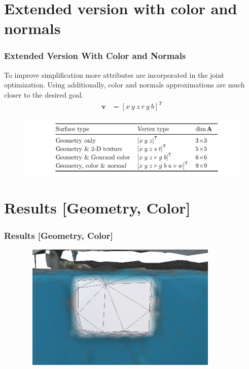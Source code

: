 \documentclass[
	10pt,
	t		%
]{beamer}
\begin{document}
\section{Extended version with color and normals}
\begin{frame}
\frametitle{Extended Version With Color and Normals}
\centering
\begin{center}
To improve simplification more attributes are incorporated in the joint optimization. Using additionally, color and normals approximations are much closer to the desired goal.
\begin{align}
\mathbf{v} &= [x \ y \ z \ r \ g \ b]^T
\end{align}
\begin{figure}[ht]
\centering
\includegraphics[width=1\textwidth]{params_table}
\end{figure}
\end{center}
\end{frame}

\section{Results [Geometry, Color]}
\begin{frame}
\frametitle{Results [Geometry, Color]}
\centering
\begin{figure}[ht]
\centering
\includegraphics[width=10cm,height=6cm]{color_2}
\end{figure}
\end{frame}
\end{document}

